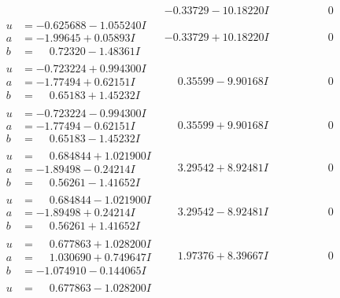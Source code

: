 \documentclass[1p]{elsarticle_modified}
\theoremstyle{definition}
\begin{document}
$$\begin{array}{c|c|c}
 & -0.33729 - 10.18220 I & \phantom{-0.000000 } 0 \\ \hline\begin{aligned}
u &= -0.625688 - 1.055240 I \\
a &= -1.99645 + 0.05893 I \\
b &= \phantom{-}0.72320 - 1.48361 I\end{aligned}
 & -0.33729 + 10.18220 I & \phantom{-0.000000 } 0 \\ \hline\begin{aligned}
u &= -0.723224 + 0.994300 I \\
a &= -1.77494 + 0.62151 I \\
b &= \phantom{-}0.65183 + 1.45232 I\end{aligned}
 & \phantom{-}0.35599 - 9.90168 I & \phantom{-0.000000 } 0 \\ \hline\begin{aligned}
u &= -0.723224 - 0.994300 I \\
a &= -1.77494 - 0.62151 I \\
b &= \phantom{-}0.65183 - 1.45232 I\end{aligned}
 & \phantom{-}0.35599 + 9.90168 I & \phantom{-0.000000 } 0 \\ \hline\begin{aligned}
u &= \phantom{-}0.684844 + 1.021900 I \\
a &= -1.89498 - 0.24214 I \\
b &= \phantom{-}0.56261 - 1.41652 I\end{aligned}
 & \phantom{-}3.29542 + 8.92481 I & \phantom{-0.000000 } 0 \\ \hline\begin{aligned}
u &= \phantom{-}0.684844 - 1.021900 I \\
a &= -1.89498 + 0.24214 I \\
b &= \phantom{-}0.56261 + 1.41652 I\end{aligned}
 & \phantom{-}3.29542 - 8.92481 I & \phantom{-0.000000 } 0 \\ \hline\begin{aligned}
u &= \phantom{-}0.677863 + 1.028200 I \\
a &= \phantom{-}1.030690 + 0.749647 I \\
b &= -1.074910 - 0.144065 I\end{aligned}
 & \phantom{-}1.97376 + 8.39667 I & \phantom{-0.000000 } 0 \\ \hline\begin{aligned}
u &= \phantom{-}0.677863 - 1.028200 I \\

\end{aligned}
\end{array}$$
\end{document}
